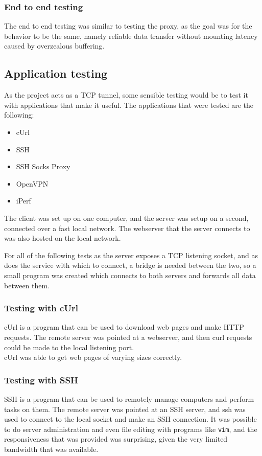 \subsubsection*{End to end testing}
The end to end testing was similar to testing the proxy, as the goal was for the behavior to be the same, namely reliable data transfer without mounting latency caused by overzealous buffering.

\subsection{Application testing}
As the project acts as a TCP tunnel, some sensible testing would be to test it with applications that make it useful.
The applications that were tested are the following:
\begin{itemize}
    \item cUrl
    \item SSH
    \item SSH Socks Proxy
    \item OpenVPN
    \item iPerf
\end{itemize}

The client was set up on one computer, and the server was setup on a second, connected over a fast local network.
The webserver that the server connects to was also hosted on the local network.\par

For all of the following tests as the server exposes a TCP listening socket, and as does the service with which to connect, a bridge is needed between the two, so a small program was created which connects to both servers and forwards all data between them.

\subsubsection*{Testing with cUrl}
cUrl is a program that can be used to download web pages and make HTTP requests.
The remote server was pointed at a webserver, and then curl requests could be made to the local listening port.\\
cUrl was able to get web pages of varying sizes correctly.

\subsubsection*{Testing with SSH}
SSH is a program that can be used to remotely manage computers and perform tasks on them.
The remote server was pointed at an SSH server, and ssh was used to connect to the local socket and make an SSH connection.
It was possible to do server administration and even file editing with programs like \texttt{vim}, and the responsiveness that was provided was surprising, given the very limited bandwidth that was available.

